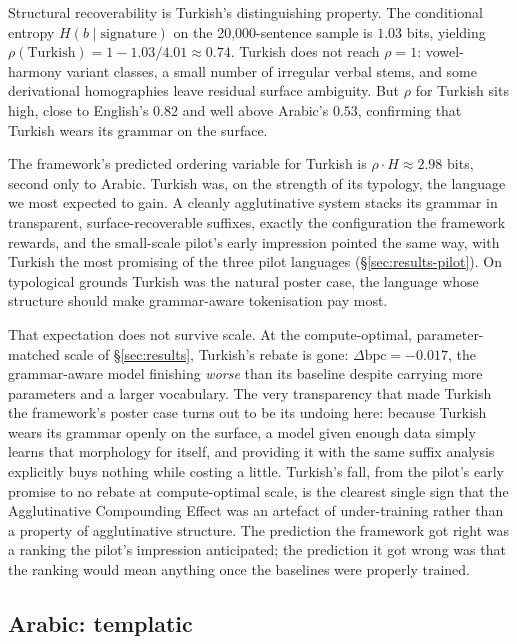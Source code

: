Structural recoverability is Turkish's distinguishing property. The conditional entropy $H(b \mid \text{signature})$ on the 20{,}000-sentence sample is $1.03$ bits, yielding $\rho(\text{Turkish}) = 1 - 1.03/4.01 \approx 0.74$. Turkish does not reach $\rho = 1$: vowel-harmony variant classes, a small number of irregular verbal stems, and some derivational homographies leave residual surface ambiguity. But $\rho$ for Turkish sits high, close to English's $0.82$ and well above Arabic's $0.53$, confirming that Turkish wears its grammar on the surface.

The framework's predicted ordering variable for Turkish is $\rho \cdot H \approx 2.98$ bits, second only to Arabic. Turkish was, on the strength of its typology, the language we most expected to gain. A cleanly agglutinative system stacks its grammar in transparent, surface-recoverable suffixes, exactly the configuration the framework rewards, and the small-scale pilot's early impression pointed the same way, with Turkish the most promising of the three pilot languages (\S\ref{sec:results-pilot}). On typological grounds Turkish was the natural poster case, the language whose structure should make grammar-aware tokenisation pay most.

That expectation does not survive scale. At the compute-optimal, parameter-matched scale of \S\ref{sec:results}, Turkish's rebate is gone: $\Delta\mathrm{bpc} = -0.017$, the grammar-aware model finishing \emph{worse} than its baseline despite carrying more parameters and a larger vocabulary. The very transparency that made Turkish the framework's poster case turns out to be its undoing here: because Turkish wears its grammar openly on the surface, a model given enough data simply learns that morphology for itself, and providing it with the same suffix analysis explicitly buys nothing while costing a little. Turkish's fall, from the pilot's early promise to no rebate at compute-optimal scale, is the clearest single sign that the Agglutinative Compounding Effect was an artefact of under-training rather than a property of agglutinative structure. The prediction the framework got right was a ranking the pilot's impression anticipated; the prediction it got wrong was that the ranking would mean anything once the baselines were properly trained.

\subsection{Arabic: templatic}
\label{sec:cases-ar}

